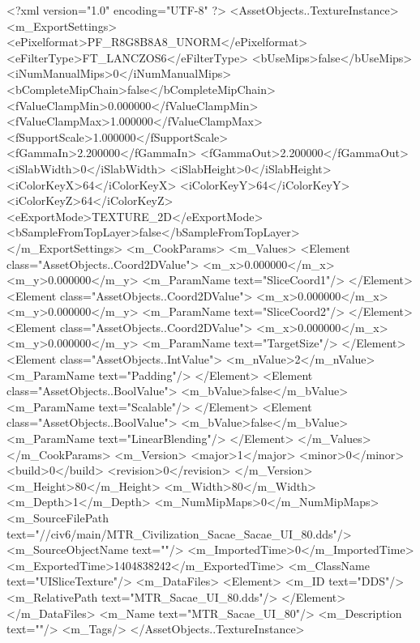 <?xml version="1.0" encoding="UTF-8" ?>
<AssetObjects..TextureInstance>
	<m_ExportSettings>
		<ePixelformat>PF_R8G8B8A8_UNORM</ePixelformat>
		<eFilterType>FT_LANCZOS6</eFilterType>
		<bUseMips>false</bUseMips>
		<iNumManualMips>0</iNumManualMips>
		<bCompleteMipChain>false</bCompleteMipChain>
		<fValueClampMin>0.000000</fValueClampMin>
		<fValueClampMax>1.000000</fValueClampMax>
		<fSupportScale>1.000000</fSupportScale>
		<fGammaIn>2.200000</fGammaIn>
		<fGammaOut>2.200000</fGammaOut>
		<iSlabWidth>0</iSlabWidth>
		<iSlabHeight>0</iSlabHeight>
		<iColorKeyX>64</iColorKeyX>
		<iColorKeyY>64</iColorKeyY>
		<iColorKeyZ>64</iColorKeyZ>
		<eExportMode>TEXTURE_2D</eExportMode>
		<bSampleFromTopLayer>false</bSampleFromTopLayer>
	</m_ExportSettings>
	<m_CookParams>
		<m_Values>
			<Element class="AssetObjects..Coord2DValue">
				<m_x>0.000000</m_x>
				<m_y>0.000000</m_y>
				<m_ParamName text="SliceCoord1"/>
			</Element>
			<Element class="AssetObjects..Coord2DValue">
				<m_x>0.000000</m_x>
				<m_y>0.000000</m_y>
				<m_ParamName text="SliceCoord2"/>
			</Element>
			<Element class="AssetObjects..Coord2DValue">
				<m_x>0.000000</m_x>
				<m_y>0.000000</m_y>
				<m_ParamName text="TargetSize"/>
			</Element>
			<Element class="AssetObjects..IntValue">
				<m_nValue>2</m_nValue>
				<m_ParamName text="Padding"/>
			</Element>
			<Element class="AssetObjects..BoolValue">
				<m_bValue>false</m_bValue>
				<m_ParamName text="Scalable"/>
			</Element>
			<Element class="AssetObjects..BoolValue">
				<m_bValue>false</m_bValue>
				<m_ParamName text="LinearBlending"/>
			</Element>
		</m_Values>
	</m_CookParams>
	<m_Version>
		<major>1</major>
		<minor>0</minor>
		<build>0</build>
		<revision>0</revision>
	</m_Version>
	<m_Height>80</m_Height>
	<m_Width>80</m_Width>
	<m_Depth>1</m_Depth>
	<m_NumMipMaps>0</m_NumMipMaps>
	<m_SourceFilePath text="//civ6/main/MTR_Civilization_Sacae\Textures\MTR_Sacae_UI_80.dds"/>
	<m_SourceObjectName text=""/>
	<m_ImportedTime>0</m_ImportedTime>
	<m_ExportedTime>1404838242</m_ExportedTime>
	<m_ClassName text="UISliceTexture"/>
	<m_DataFiles>
		<Element>
			<m_ID text="DDS"/>
			<m_RelativePath text="MTR_Sacae_UI_80.dds"/>
		</Element>
	</m_DataFiles>
	<m_Name text="MTR_Sacae_UI_80"/>
	<m_Description text=""/>
	<m_Tags/>
</AssetObjects..TextureInstance>

